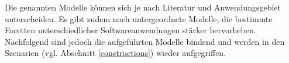 Die genannten Modelle können sich je nach Literatur und Anwendungsgebiet unterscheiden. Es gibt zudem noch untergeordnete Modelle, die bestimmte Facetten unterschiedlicher Softwareanwendungen stärker hervorheben. Nachfolgend sind jedoch die aufgeführten Modelle bindend und werden in den Szenarien (vgl. Abschnitt \ref{constructions}) wieder aufgegriffen.